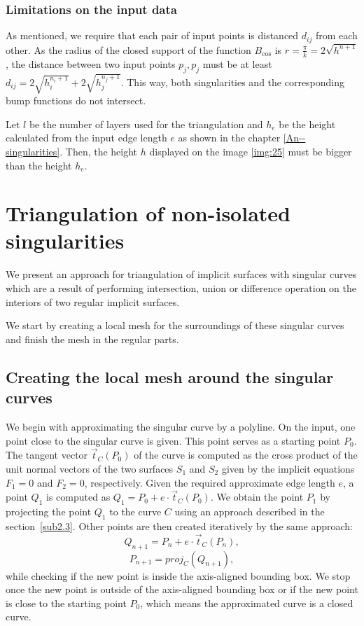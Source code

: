 \subsubsection*{Limitations on the input data}
\label{limitations}
As mentioned, we require that each pair of input points is
distanced $d_{ij}$ from each other. As the radius of the closed support
of the function $B_{\cos}$ is $r=\frac{\pi}{k}=2\sqrt{h^{n+1}}$, the 
distance between two input points $p_j, p_j$ must be at least
$d_{ij} = 2\sqrt{h_i^{n_i+1}}+2\sqrt{h_j^{n_j+1}}$. This way, both singularities
and the corresponding bump functions do not intersect. 

Let $l$ be the number of layers used for the triangulation and $h_e$ be the height
calculated from the input edge length $e$ as shown in the chapter \ref{An--singularities}.
Then, the height $h$ displayed on the image \ref{img:25} must be bigger than the
height $h_e$.

\section{Triangulation of non-isolated singularities}
\label{sub3.3} 

We present an approach for triangulation of implicit surfaces with singular
curves which are
a result of performing intersection, union or difference operation on the interiors of two
regular implicit surfaces.

We start by creating a local mesh for the surroundings of these singular
curves and finish the mesh in the regular parts.

\subsection{Creating the local mesh around the singular curves}

We begin with approximating the singular curve by a polyline.
On the input, one point close to the singular curve is given. This point serves as
a starting point $P_0$. The tangent vector $\vec{t}_C(P_0)$ of the curve is computed as
the cross product of the unit normal vectors of the two surfaces $S_1$ and $S_2$ given
by the implicit equations $F_1=0$ and $F_2=0$, respectively.
Given the required approximate edge length $e$, a point $Q_1$ is computed as
$Q_1 = P_0 + e \cdot \vec{t}_C(P_0)$. We obtain the point $P_1$ by projecting the point 
$Q_1$ to the curve $C$ using an approach described in the section~\ref{sub2.3}.
Other points are then created iteratively by the same approach:
$$Q_{n+1} = P_n + e \cdot \vec{t}_C(P_n),$$
$$P_{n+1} = proj_C(Q_{n+1}),$$
while checking if the new point is inside the axis-aligned bounding box.
We stop once the new point is outside of the axis-aligned bounding box or
if the new point is close to the starting point $P_0$, which means the approximated
curve is a closed curve.

